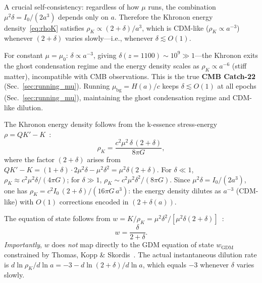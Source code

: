 \documentclass[prd,twocolumn,superscriptaddress,longbibliography,floatfix]{revtex4-2}
\begin{document}
A crucial self-consistency: regardless of how $\mu$ runs,
the combination $\mu^2\delta = I_0/(2a^3)$ depends only on
$a$.  Therefore the Khronon energy
density~\eqref{eq:rhoK} satisfies
$\rho_K \propto (2+\delta)/a^3$, which is CDM-like
($\rho_K \propto a^{-3}$) whenever $(2+\delta)$ varies
slowly---i.e., whenever $\delta \lesssim O(1)$.

For constant $\mu = \mu_0$:
$\delta \propto a^{-3}$, giving $\delta(z=1100)
\sim 10^9 \gg 1$---the Khronon exits the ghost
condensation regime and the energy density scales as
$\rho_K \propto a^{-6}$ (stiff matter), incompatible
with CMB observations.  This is the true
\textbf{CMB Catch-22} (Sec.~\ref{sec:running_mu}).
Running $\mu_{\mathrm{bg}} = H(a)/c$ keeps
$\delta \lesssim O(1)$ at all epochs
(Sec.~\ref{sec:running_mu}), maintaining the ghost
condensation regime and CDM-like dilution.

The Khronon energy density follows from the k-essence
stress-energy $\rho = QK' - K$~\cite{BS2024}:
\begin{equation}
\rho_K = \frac{c^2\mu^2\,\delta\,(2+\delta)}{8\pi G},
\label{eq:rhoK}
\end{equation}
where the factor $(2+\delta)$ arises from
$QK' - K = (1{+}\delta)\cdot 2\mu^2\delta - \mu^2\delta^2
= \mu^2\delta(2{+}\delta)$.
For $\delta \ll 1$, $\rho_K \approx c^2\mu^2\delta/({4\pi G})$;
for $\delta \gg 1$, $\rho_K \sim c^2\mu^2\delta^2/(8\pi G)$.
Since $\mu^2\delta = I_0/(2a^3)$, one has
$\rho_K = c^2 I_0\,(2+\delta)/(16\pi G\,a^3)$:
the energy density dilutes as $a^{-3}$ (CDM-like)
with $O(1)$ corrections encoded in $(2+\delta(a))$.

The equation of state follows from $w = K/\rho_K
= \mu^2\delta^2/[\mu^2\delta(2{+}\delta)]$~\cite{BS2024}:
\begin{equation}
w = \frac{\delta}{2+\delta}.
\label{eq:w_eos}
\end{equation}
\emph{Importantly}, $w$ does \emph{not} map
directly to the GDM equation of state
$w_{\mathrm{GDM}}$ constrained by
Thomas, Kopp \& Skordis~\cite{TKS2016}.
The actual instantaneous dilution rate is
$d\ln\rho_K/d\ln a = -3 - d\ln(2{+}\delta)/d\ln a$,
which equals $-3$ whenever $\delta$ varies slowly.
\end{document}
